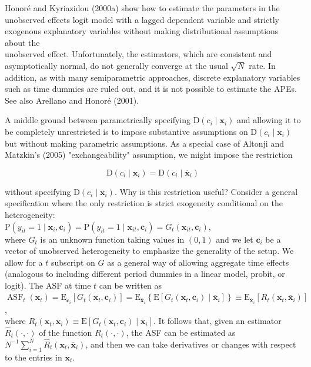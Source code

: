 \documentclass[10pt]{article}
\begin{document}
Honoré and Kyriazidou (2000a) show how to estimate the parameters in the unobserved effects logit model with a lagged dependent variable and strictly exogenous explanatory variables without making distributional assumptions about the\\
unobserved effect. Unfortunately, the estimators, which are consistent and asymptotically normal, do not generally converge at the usual $\sqrt{N}$ rate. In addition, as with many semiparametric approaches, discrete explanatory variables such as time dummies are ruled out, and it is not possible to estimate the APEs. See also Arellano and Honoré (2001).

A middle ground between parametrically specifying $\mathrm{D}\left(c_{i} \mid \mathbf{x}_{i}\right)$ and allowing it to be completely unrestricted is to impose substantive assumptions on $\mathrm{D}\left(c_{i} \mid \mathbf{x}_{i}\right)$ but without making parametric assumptions. As a special case of Altonji and Matzkin's (2005) "exchangeability" assumption, we might impose the restriction


\begin{equation*}
\mathrm{D}\left(c_{i} \mid \mathbf{x}_{i}\right)=\mathrm{D}\left(c_{i} \mid \overline{\mathbf{x}}_{i}\right) \tag{15.91}
\end{equation*}


without specifying $\mathrm{D}\left(c_{i} \mid \overline{\mathbf{x}}_{i}\right)$. Why is this restriction useful? Consider a general specification where the only restriction is strict exogeneity conditional on the heterogeneity:\\
$\mathrm{P}\left(y_{i t}=1 \mid \mathbf{x}_{i}, \mathbf{c}_{i}\right)=\mathrm{P}\left(y_{i t}=1 \mid \mathbf{x}_{i t}, \mathbf{c}_{i}\right)=G_{t}\left(\mathbf{x}_{i t}, \mathbf{c}_{i}\right)$,\\
where $G_{t}$ is an unknown function taking values in $(0,1)$ and we let $\mathbf{c}_{i}$ be a vector of unobserved heterogeneity to emphasize the generality of the setup. We allow for a $t$ subscript on $G$ as a general way of allowing aggregate time effects (analogous to including different period dummies in a linear model, probit, or logit). The ASF at time $t$ can be written as\\
$\operatorname{ASF}_{t}\left(\mathbf{x}_{t}\right)=\mathrm{E}_{\mathbf{c}_{i}}\left[G_{t}\left(\mathbf{x}_{t}, \mathbf{c}_{i}\right)\right]=\mathrm{E}_{\overline{\mathbf{x}}_{i}}\left\{\mathrm{E}\left[G_{t}\left(\mathbf{x}_{t}, \mathbf{c}_{i}\right) \mid \overline{\mathbf{x}}_{i}\right]\right\} \equiv \mathrm{E}_{\overline{\mathbf{x}}_{i}}\left[R_{t}\left(\mathbf{x}_{t}, \overline{\mathbf{x}}_{i}\right)\right]$,\\
where $R_{t}\left(\mathbf{x}_{t}, \overline{\mathbf{x}}_{i}\right) \equiv \mathrm{E}\left[G_{t}\left(\mathbf{x}_{t}, \mathbf{c}_{i}\right) \mid \overline{\mathbf{x}}_{i}\right]$. It follows that, given an estimator $\hat{R}_{t}(\cdot, \cdot)$ of the function $R_{t}(\cdot, \cdot)$, the ASF can be estimated as $N^{-1} \sum_{i=1}^{N} \hat{R}_{t}\left(\mathbf{x}_{t}, \overline{\mathbf{x}}_{i}\right)$, and then we can take derivatives or changes with respect to the entries in $\mathbf{x}_{t}$.
\end{document}
